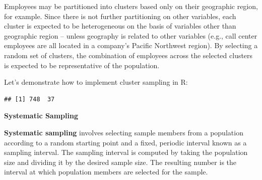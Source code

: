\documentclass[
]{book}
\newenvironment{Shaded}{\begin{snugshade}}{\end{snugshade}}
\newcommand{\AttributeTok}[1]{\textcolor[rgb]{0.77,0.63,0.00}{#1}}
\newcommand{\CommentTok}[1]{\textcolor[rgb]{0.56,0.35,0.01}{\textit{#1}}}
\newcommand{\DecValTok}[1]{\textcolor[rgb]{0.00,0.00,0.81}{#1}}
\newcommand{\FunctionTok}[1]{\textcolor[rgb]{0.00,0.00,0.00}{#1}}
\newcommand{\NormalTok}[1]{#1}
\newcommand{\OtherTok}[1]{\textcolor[rgb]{0.56,0.35,0.01}{#1}}
\newcommand{\SpecialCharTok}[1]{\textcolor[rgb]{0.00,0.00,0.00}{#1}}
\begin{document}
Employees may be partitioned into clusters based only on their geographic region, for example. Since there is not further partitioning on other variables, each cluster is expected to be heterogeneous on the basis of variables other than geographic region -- unless geography is related to other variables (e.g., call center employees are all located in a company's Pacific Northwest region). By selecting a random set of clusters, the combination of employees across the selected clusters is expected to be representative of the population.

Let's demonstrate how to implement cluster sampling in R:

\begin{Shaded}
\end{Shaded}

\begin{verbatim}
## [1] 748  37
\end{verbatim}

\textbf{Systematic Sampling}

\textbf{Systematic sampling} involves selecting sample members from a population according to a random starting point and a fixed, periodic interval known as a sampling interval. The sampling interval is computed by taking the population size and dividing it by the desired sample size. The resulting number is the interval at which population members are selected for the sample.
\end{document}
